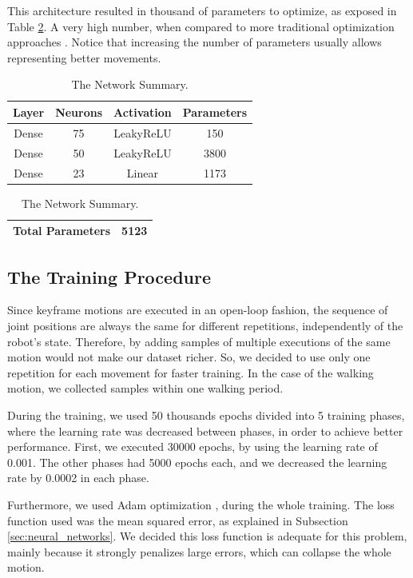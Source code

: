 This architecture resulted in thousand of parameters to optimize, as exposed in Table \ref{tab:network_summary}. A very high number, when compared to more traditional optimization approaches \cite{AAAI12-MacAlpine}. Notice that increasing the number of parameters usually allows representing better movements.

\begin{table}[htbp]
\caption{The Network Summary.}
\begin{center}
\begin{tabular}{|c|c|c|c|}
\hline
\textbf{Layer}&{\textbf{Neurons}}& \textbf{Activation}& \textbf{Parameters} \\
\hline
Dense & 75 & LeakyReLU & 150  \\
\hline
Dense & 50 & LeakyReLU & 3800 \\
\hline
Dense & 23 & Linear & 1173 \\
\hline
\end{tabular}
\begin{tabular}{|c|c|}
\hline
\textbf{Total Parameters} & 5123 \\
\hline
\end{tabular}
\label{tab:network_summary}
\end{center}
\end{table}


\subsection{The Training Procedure}
Since keyframe motions are executed in an open-loop fashion, the sequence of joint positions are always the same for different repetitions, independently of the robot's state. Therefore, by adding samples of multiple executions of the same motion would not make our dataset richer. So, we decided to use only one repetition for each movement for faster training. In the case of the walking motion, we collected samples within one walking period.

During the training, we used 50 thousands epochs divided into 5 training phases, where the learning rate was decreased between phases, in order to achieve better performance. First, we executed 30000 epochs, by using the learning rate of 0.001. The other phases had 5000 epochs each, and we decreased the learning rate by 0.0002 in each phase.

Furthermore, we used Adam optimization \cite{adam2014}, during the whole training. The loss function used was the mean squared error, as explained in Subsection \ref{sec:neural_networks}. We decided this loss function is adequate for this problem, mainly because it strongly penalizes large errors, which can collapse the whole motion.

